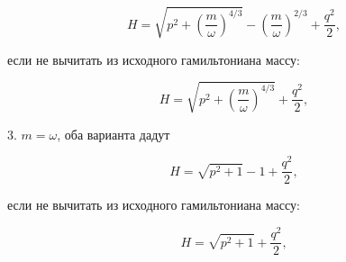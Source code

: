 \documentclass[12pt,a4paper,oneside]{article}
\begin{document}
\begin{equation}
 H = \sqrt{p^2 + \left(\frac{m}{\omega} \right)^{4/3}} - \left(\frac{m}{\omega} \right)^{2/3}  + \dfrac{q^2}{2},
\end{equation}

если не вычитать из исходного гамильтониана  массу:

\begin{equation}
 H = \sqrt{p^2 + \left(\frac{m}{\omega} \right)^{4/3}} + \dfrac{q^2}{2},
\end{equation}

3. $m = \omega$, оба варианта дадут

\begin{equation}
 H = \sqrt{p^2 + 1} - 1 + \dfrac{q^2}{2},
\end{equation}

если не вычитать из исходного гамильтониана  массу:

\begin{equation}
 H = \sqrt{p^2 + 1} + \dfrac{q^2}{2},
\end{equation}
\end{document}
